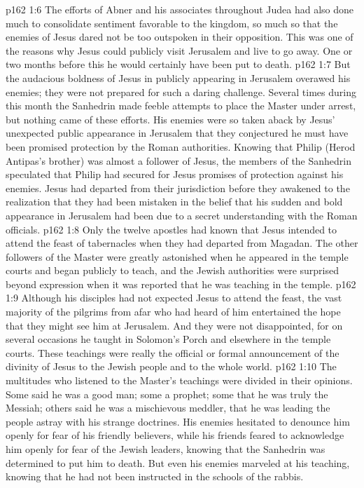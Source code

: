 \vs p162 1:6 The efforts of Abner and his associates throughout Judea had also done much to consolidate sentiment favorable to the kingdom, so much so that the enemies of Jesus dared not be too outspoken in their opposition. This was one of the reasons why Jesus could publicly visit Jerusalem and live to go away. One or two months before this he would certainly have been put to death.
\vs p162 1:7 But the audacious boldness of Jesus in publicly appearing in Jerusalem overawed his enemies; they were not prepared for such a daring challenge. Several times during this month the Sanhedrin made feeble attempts to place the Master under arrest, but nothing came of these efforts. His enemies were so taken aback by Jesus’ unexpected public appearance in Jerusalem that they conjectured he must have been promised protection by the Roman authorities. Knowing that Philip (Herod Antipas’s brother) was almost a follower of Jesus, the members of the Sanhedrin speculated that Philip had secured for Jesus promises of protection against his enemies. Jesus had departed from their jurisdiction before they awakened to the realization that they had been mistaken in the belief that his sudden and bold appearance in Jerusalem had been due to a secret understanding with the Roman officials.
\vs p162 1:8 Only the twelve apostles had known that Jesus intended to attend the feast of tabernacles when they had departed from Magadan. The other followers of the Master were greatly astonished when he appeared in the temple courts and began publicly to teach, and the Jewish authorities were surprised beyond expression when it was reported that he was teaching in the temple.
\vs p162 1:9 Although his disciples had not expected Jesus to attend the feast, the vast majority of the pilgrims from afar who had heard of him entertained the hope that they might see him at Jerusalem. And they were not disappointed, for on several occasions he taught in Solomon’s Porch and elsewhere in the temple courts. These teachings were really the official or formal announcement of the divinity of Jesus to the Jewish people and to the whole world.
\vs p162 1:10 The multitudes who listened to the Master’s teachings were divided in their opinions. Some said he was a good man; some a prophet; some that he was truly the Messiah; others said he was a mischievous meddler, that he was leading the people astray with his strange doctrines. His enemies hesitated to denounce him openly for fear of his friendly believers, while his friends feared to acknowledge him openly for fear of the Jewish leaders, knowing that the Sanhedrin was determined to put him to death. But even his enemies marveled at his teaching, knowing that he had not been instructed in the schools of the rabbis.

